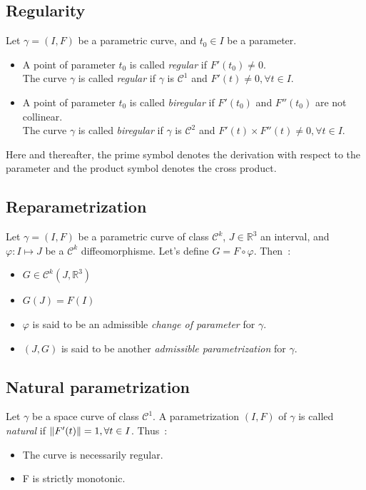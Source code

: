\subsection{Regularity}
Let $\gamma=(I,F)$ be a parametric curve, and $t_0 \in I$ be a parameter.
\begin{itemize}
	\item A point of parameter $t_0$ is called \emph{regular} if $F'(t_0) \neq 0$.
	\\The curve $\gamma$ is called \emph{regular} if $\gamma$ is $\mathcal{C}^{1}$ and $F'(t) \neq 0, \forall t \in I$.
	\item A point of parameter $t_0$ is called \emph{biregular} if $F'(t_0)$ and $F''(t_0)$ are not collinear.
	\\The curve $\gamma$ is called \emph{biregular} if $\gamma$ is $\mathcal{C}^{2}$ and  $F'(t) \times F''(t) \neq 0, \forall t \in I$.
\end{itemize}
Here and thereafter, the prime symbol denotes the derivation with respect to the parameter and the product symbol denotes the cross product.
\subsection{Reparametrization}
Let $\gamma=(I,F)$ be a parametric curve of class ${\mathcal{C}}^{k}$, $J \in {\mathbb{R}}^{3}$ an interval, and $\varphi\colon I\mapsto J$ be a ${\mathcal{C}}^{k}$ diffeomorphisme. Let's define $G=F\circ\varphi$. Then~:
\begin{itemize}
	\item $G\in{\mathcal{C}}^{k}(J,{\mathbb{R}}^3)$
	\item $G(J)=F(I)$
	\item $\varphi$ is said to be an admissible \emph{change of parameter} for $\gamma$.
	\item  $(J,G)$ is said to be another \emph{admissible parametrization} for $\gamma$.
\end{itemize}

\subsection{Natural parametrization}
Let $\gamma$ be a space curve of class ${\mathcal{C}}^{1}$. A parametrization $(I,F)$ of $\gamma$ is called \emph{natural} if $\lVert F'(t)\rVert = 1, \forall t \in I$. Thus~:
\begin{itemize}
	\item The curve is necessarily regular.
	\item F is strictly monotonic.
\end{itemize}

